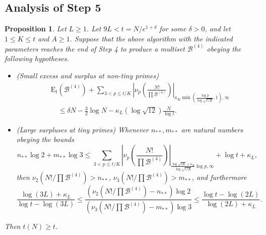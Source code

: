 \documentclass[12pt,a4paper,reqno]{amsart}
\numberwithin{equation}{section}
\theoremstyle{plain}
\newtheorem{proposition}[theorem]{Proposition}
\theoremstyle{definition}
\newcommand\tuple{{\mathcal B}}
\newcommand\excess{{\mathrm{E}}}
\begin{document}
\subsection{Analysis of Step 5}

\begin{proposition}\label{balance-23'}  Let $L \geq 1$.
  Let $9L < t = N/e^{1+\delta}$ for some $\delta>0$, and let $1 \leq K \leq t$ and $A \geq 1$.  Suppose that the above algorithm with the indicated parameters reaches the end of Step 4 to produce a multiset $\tuple^{(4)}$ obeying the following hypotheses.
\begin{itemize}
\item[(i)] (Small excess and surplus at non-tiny primes)
\begin{equation}\label{new-balance-4}
  \begin{split}
&      \excess_t(\tuple^{(4)}) + \sum_{3 < p \leq t/K}
 \left|\nu_p\left(\frac{N!}{\prod \tuple^{(4)}}\right)\right|_{\kappa_K \min(\frac{\log p}{\log \sqrt{t/K}},1),\infty} \\
&\quad    \leq \delta N - \frac{3}{2} \log N - \kappa_L (\log \sqrt{12}) \frac{N}{\log t}.
  \end{split}
 \end{equation}
 \item[(ii)] (Large surpluses at tiny primes) Whenever $n_{**}, m_{**}$ are natural numbers obeying the  bounds
 $$ n_{**} \log 2 + m_{**} \log 3 \leq 
 \sum_{3 < p \leq t/K}
 \left|\nu_p\left(\frac{N!}{\prod \tuple^{(4)}}\right)\right|_{\frac{\log \sqrt{tK} + \kappa_K}{\log\sqrt{t/K}} \log p,\infty}
 + \log t + \kappa_L,$$
 then $\nu_2(N!/\prod \tuple^{(4)}) > n_{**}$, $\nu_3(N!/\prod \tuple^{(4)}) > m_{**}$, and furthermore
 $$
 \frac{\log(3L)+\kappa_L}{\log t - \log(3L)} \leq \frac{(\nu_2(N!/\prod \tuple^{(4)})-n_{**}) \log 2}{(\nu_3(N!/\prod \tuple^{(4)})-m_{**}) \log 3} \leq \frac{\log t - \log(2L)}{\log(2L)+\kappa_L}.$$
 \end{itemize}
  Then $t(N) \geq t$.
\end{proposition}
\end{document}
